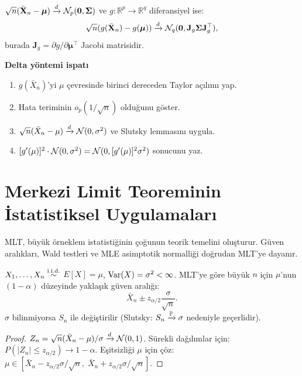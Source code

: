 \begin{teorem}\label{thm:delta_cok}
$\sqrt{n}(\bar{\mathbf{X}}_n-\boldsymbol\mu)\xrightarrow{d}\mathcal{N}_p(\mathbf{0},\boldsymbol\Sigma)$ ve $g:\mathbb{R}^p\to\mathbb{R}^q$ diferansiyel ise:
\[
  \sqrt{n}(g(\bar{\mathbf{X}}_n)-g(\boldsymbol\mu))\xrightarrow{d}\mathcal{N}_q(\mathbf{0},\mathbf{J}_g\boldsymbol\Sigma\mathbf{J}_g^\top),
\]
burada $\mathbf{J}_g=\partial g/\partial\boldsymbol\mu^\top$ Jacobi matrisidir.
\end{teorem}

\begin{ispatiskele}
\textbf{Delta yöntemi ispatı}
\begin{enumerate}
  \item $g(\bar X_n)$'yi $\mu$ çevresinde birinci dereceden Taylor açılımı yap.
  \item Hata teriminin $o_p(1/\sqrt{n})$ olduğunu göster.
  \item $\sqrt{n}(\bar X_n-\mu)\xrightarrow{d}\mathcal{N}(0,\sigma^2)$ ve Slutsky lemmasını uygula.
  \item $[g'(\mu)]^2\cdot\mathcal{N}(0,\sigma^2)=\mathcal{N}(0,[g'(\mu)]^2\sigma^2)$ sonucunu yaz.
\end{enumerate}
\end{ispatiskele}

\section{Merkezi Limit Teoreminin İstatistiksel Uygulamaları}
\label{sec:mlt_istatistik}

\begin{motivasyon}
MLT, büyük örneklem istatistiğinin çoğunun teorik temelini oluşturur. Güven aralıkları, Wald testleri ve MLE asimptotik normalliği doğrudan MLT'ye dayanır.
\end{motivasyon}

\begin{teorem}\label{thm:wald_ga}
$X_1,\ldots,X_n\overset{\text{i.i.d.}}{\sim}$ $E[X]=\mu$, $\operatorname{Var}(X)=\sigma^2<\infty$. MLT'ye göre büyük $n$ için $\mu$'nun $(1-\alpha)$ düzeyinde yaklaşık güven aralığı:
\[
  \bar X_n \pm z_{\alpha/2}\frac{\sigma}{\sqrt{n}}.
\]
$\sigma$ bilinmiyorsa $S_n$ ile değiştirilir (Slutsky: $S_n\xrightarrow{\mathbb{P}}\sigma$ nedeniyle geçerlidir).
\end{teorem}

\begin{proof}
$Z_n=\sqrt{n}(\bar X_n-\mu)/\sigma\xrightarrow{d}\mathcal{N}(0,1)$. Sürekli dağılımlar için: $P(|Z_n|\leq z_{\alpha/2})\to1-\alpha$. Eşitsizliği $\mu$ için çöz: $\mu\in[\bar X_n-z_{\alpha/2}\sigma/\sqrt{n},\;\bar X_n+z_{\alpha/2}\sigma/\sqrt{n}]$.
\end{proof}


